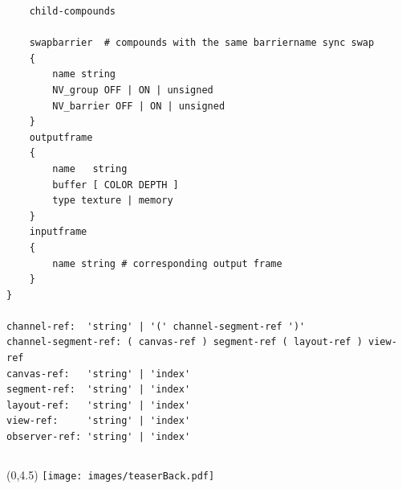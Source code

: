 \documentclass[10pt,a4]{scrartcl}
\begin{document}
{\begin{lstlisting}
    child-compounds

    swapbarrier  # compounds with the same barriername sync swap
    {
        name string
        NV_group OFF | ON | unsigned
        NV_barrier OFF | ON | unsigned
    }
    outputframe
    {
        name   string
        buffer [ COLOR DEPTH ]
        type texture | memory
    }
    inputframe
    {
        name string # corresponding output frame
    }
}

channel-ref:  'string' | '(' channel-segment-ref ')'
channel-segment-ref: ( canvas-ref ) segment-ref ( layout-ref ) view-ref
canvas-ref:   'string' | 'index'
segment-ref:  'string' | 'index'
layout-ref:   'string' | 'index'
view-ref:     'string' | 'index'
observer-ref: 'string' | 'index'
\end{lstlisting}}

{\footnotesize\begin{lstlisting}
\end{lstlisting}}
\fi

\cleardoublepage
\pagestyle{empty}
\begin{textblock}{}(0,4.5)
  \hspace{-1cm}\texttt{[image: images/teaserBack.pdf]}
\end{textblock}
\end{document}
